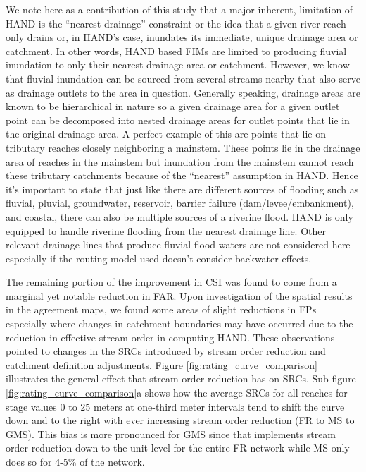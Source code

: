 We note here as a contribution of this study that a major inherent, limitation of HAND is the ``nearest drainage'' constraint or the idea that a given river reach only drains or, in HAND's case, inundates its immediate, unique drainage area or catchment.
In other words, HAND based FIMs are limited to producing fluvial inundation to only their nearest drainage area or catchment.
However, we know that fluvial inundation can be sourced from several streams nearby that also serve as drainage outlets to the area in question.
Generally speaking, drainage areas are known to be hierarchical in nature so a given drainage area for a given outlet point can be decomposed into nested drainage areas for outlet points that lie in the original drainage area.
A perfect example of this are points that lie on tributary reaches closely neighboring a mainstem.
These points lie in the drainage area of reaches in the mainstem but inundation from the mainstem cannot reach these tributary catchments because of the ``nearest'' assumption in HAND.
Hence it's important to state that just like there are different sources of flooding such as fluvial, pluvial, groundwater, reservoir, barrier failure (dam/levee/embankment), and coastal, there can also be multiple sources of a riverine flood.
HAND is only equipped to handle riverine flooding from the nearest drainage line.
Other relevant drainage lines that produce fluvial flood waters are not considered here especially if the routing model used doesn't consider backwater effects.

The remaining portion of the improvement in CSI was found to come from a marginal yet notable reduction in FAR.
Upon investigation of the spatial results in the agreement maps, we found some areas of slight reductions in FPs especially where changes in catchment boundaries may have occurred due to the reduction in effective stream order in computing HAND.
These observations pointed to changes in the SRCs introduced by stream order reduction and catchment definition adjustments.
Figure \ref{fig:rating_curve_comparison} illustrates the general effect that stream order reduction has on SRCs.
Sub-figure \ref{fig:rating_curve_comparison}a shows how the average SRCs for all reaches for stage values 0 to 25 meters at one-third meter intervals tend to shift the curve down and to the right with ever increasing stream order reduction (FR to MS to GMS). 
This bias is more pronounced for GMS since that implements stream order reduction down to the unit level for the entire FR network while MS only does so for 4-5\% of the network.

